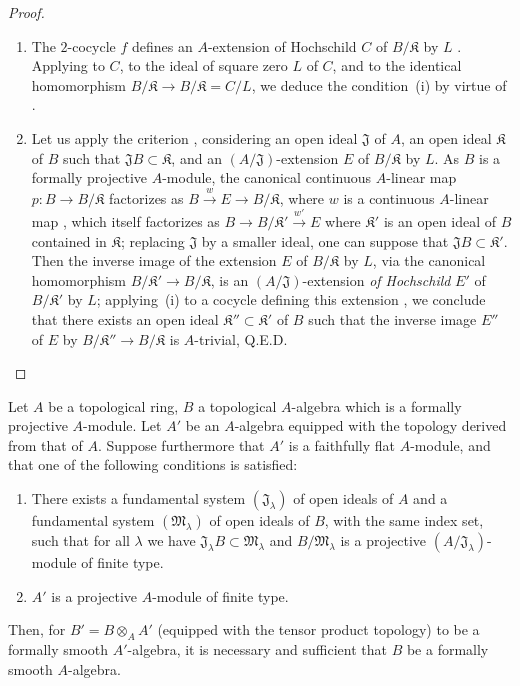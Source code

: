 \begin{proof}
\begin{enumerate}
  \item[\rm(i)] The $2$-cocycle $f$ defines an $A$-extension of Hochschild $C$ of $B/\mathfrak K$ by $L$ .
  Applying  to $C$, to the ideal of square zero $L$ of $C$, and to the identical homomorphism $B/\mathfrak K\to B/\mathfrak K=C/L$, we deduce the condition~(i) by virtue of .

  \item[\rm(ii)] Let us apply the criterion , considering an open ideal $\mathfrak{J}$ of $A$, an open ideal $\mathfrak K$ of $B$ such that $\mathfrak{J}B\subset\mathfrak K$, and an $(A/\mathfrak{J})$-extension $E$ of $B/\mathfrak K$ by $L$.
  As $B$ is a formally projective $A$-module, the canonical continuous $A$-linear map $p:B\to B/\mathfrak K$ factorizes as $B\xrightarrow{w}E\to B/\mathfrak K$, where $w$ is a continuous $A$-linear map ,
  which itself factorizes as $B\to B/\mathfrak K'\xrightarrow{w'}E$ where $\mathfrak K'$ is an open ideal of $B$ contained in $\mathfrak K$;
  replacing $\mathfrak{J}$ by a smaller ideal, one can suppose that $\mathfrak{J}B\subset\mathfrak K'$.
  Then the inverse image of the extension $E$ of $B/\mathfrak K$ by $L$, via the canonical homomorphism $B/\mathfrak K'\to B/\mathfrak K$, is an $(A/\mathfrak{J})$-extension \emph{of Hochschild} $E'$ of $B/\mathfrak K'$ by $L$;
  applying~(i) to a cocycle defining this extension , we conclude that there exists an open ideal $\mathfrak K''\subset\mathfrak K'$ of $B$ such that the inverse image $E''$ of $E$ by $B/\mathfrak K''\to B/\mathfrak K$ is $A$-trivial, Q.E.D.
\end{enumerate}
\end{proof}

\begin{corollary}[19.4.6]
\label{0.19.4.6}
Let $A$ be a topological ring, $B$ a topological $A$-algebra which is a formally projective $A$-module.
Let $A'$ be an $A$-algebra equipped with the topology derived from that of $A$.
Suppose furthermore that $A'$ is a faithfully flat $A$-module, and that one of the following conditions is satisfied:
\begin{enumerate}
  \item[$1^\circ$] There exists a fundamental system $(\mathfrak{J}_\lambda)$ of open ideals of $A$ and a fundamental system $(\mathfrak{M}_\lambda)$ of open ideals of $B$, with the same index set, such that for all $\lambda$ we have $\mathfrak{J}_\lambda B\subset\mathfrak{M}_\lambda$ and $B/\mathfrak{M}_\lambda$ is a projective $(A/\mathfrak{J}_\lambda)$-module of finite type.
  \item[$2^\circ$] $A'$ is a projective $A$-module of finite type.
\end{enumerate}
Then, for $B'=B\otimes_A A'$ (equipped with the tensor product topology) to be a formally smooth $A'$-algebra, it is necessary and sufficient that $B$ be a formally smooth $A$-algebra.
\end{corollary}

